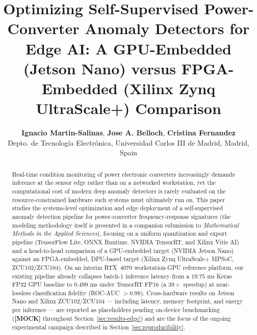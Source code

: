 \documentclass[11pt,a4paper]{article}
\title{\textbf{Optimizing Self-Supervised Power-Converter Anomaly Detectors for Edge AI: A GPU-Embedded (Jetson Nano) versus FPGA-Embedded (Xilinx Zynq UltraScale+) Comparison}}
\author{
    \textbf{Ignacio Martin-Salinas}, \textbf{Jose A. Belloch}, \textbf{Cristina Fernandez} \\
    \small Depto. de Tecnolog\'{i}a Electr\'{o}nica, Universidad Carlos III de Madrid, Madrid, Spain
}
\date{}
\begin{document}
\maketitle

\begin{center}
\end{center}

\begin{abstract}
Real-time condition monitoring of power electronic converters increasingly demands
inference at the sensor edge rather than on a networked workstation, yet the
computational cost of modern deep anomaly detectors is rarely evaluated on the
resource-constrained hardware such systems must ultimately run on. This paper studies
the systems-level optimization and edge deployment of a self-supervised anomaly
detection pipeline for power-converter frequency-response signatures (the modeling
methodology itself is presented in a companion submission to \emph{Mathematical Methods
in the Applied Sciences}), focusing on a uniform quantization and export pipeline
(TensorFlow Lite, ONNX Runtime, NVIDIA TensorRT, and Xilinx Vitis AI) and a
head-to-head comparison of a GPU-embedded target (NVIDIA Jetson Nano) against an
FPGA-embedded, DPU-based target (Xilinx Zynq UltraScale+ MPSoC, ZCU102/ZCU104). On an
interim RTX~4070 workstation-GPU reference platform, our existing pipeline already
collapses batch-1 inference latency from a $19.75\text{ ms}$ Keras FP32 GPU baseline to
$0.499\text{ ms}$ under TensorRT FP16 (a $39\times$ speedup) at near-lossless
classification fidelity (ROC-AUC $>0.98$). Cross-hardware results on Jetson Nano and
Xilinx ZCU102/ZCU104 --- including latency, memory footprint, and energy per inference
--- are reported as placeholders pending on-device benchmarking (\textbf{[MOCK]}
throughout Section~\ref{sec:results-edge}) and are the focus of the ongoing experimental
campaign described in Section~\ref{sec:reproducibility}.
\end{abstract}
\end{document}
